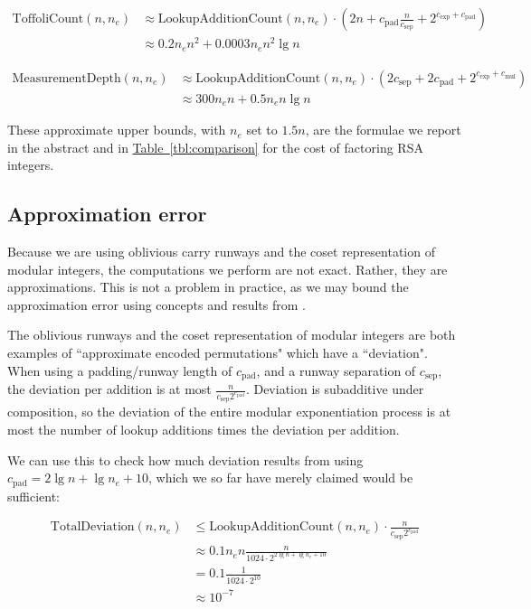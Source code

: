 \documentclass[superscriptaddress,notitlepage,longbibliography]{revtex4-1}
\theoremstyle{definition}
\theoremstyle{definition}
\newcommand{\tbl}[1]{\hyperref[tbl:#1]{Table~\ref*{tbl:#1}}}
\newcommand{\lenexp}{{n_e}}
\newcommand{\gexp}{{c_{\text{exp}}}}
\newcommand{\gmul}{{c_{\text{mul}}}}
\newcommand{\gsep}{{c_{\text{sep}}}}
\newcommand{\gpad}{{c_{\text{pad}}}}
\begin{document}
\begin{equation}
\begin{aligned}
    \text{ToffoliCount}(n, \lenexp)
    &\approx \text{LookupAdditionCount}(n, \lenexp) \cdot \left(2n + \gpad \frac{n}{\gsep} + 2^{\gexp + \gpad} \right)
    \\&\approx 0.2 \lenexp n^2 + 0.0003 \lenexp n^2 \lg n
\end{aligned}
\end{equation}

\begin{equation}
\begin{aligned}
    \text{MeasurementDepth}(n, \lenexp)
    &\approx \text{LookupAdditionCount}(n, \lenexp) \cdot \left(2 \gsep + 2\gpad + 2^{\gexp + \gmul} \right)
    \\&\approx 300 \lenexp n + 0.5 \lenexp n \lg n
\end{aligned}
\end{equation}

These approximate upper bounds, with $\lenexp$ set to $1.5n$, are the formulae we report in the abstract and in \tbl{comparison} for the cost of factoring RSA integers.


\subsection{Approximation error}

Because we are using oblivious carry runways and the coset representation of modular integers, the computations we perform are not exact.
Rather, they are approximations.
This is not a problem in practice, as we may bound the approximation error using concepts and results from \cite{gidney2019approximatepermutation}.

The oblivious runways and the coset representation of modular integers are both examples of ``approximate encoded permutations" which have a ``deviation".
When using a padding/runway length of $\gpad$, and a runway separation of $\gsep$, the deviation per addition is at most $\frac{n}{\gsep 2^{\gpad}}$.
Deviation is subadditive under composition, so the deviation of the entire modular exponentiation process is at most the number of lookup additions times the deviation per addition.

We can use this to check how much deviation results from using $\gpad = 2 \lg n + \lg \lenexp + 10$, which we so far have merely claimed would be sufficient:

\begin{equation}
\begin{aligned}
    \text{TotalDeviation}(n, \lenexp)
    &\leq \text{LookupAdditionCount}(n, \lenexp) \cdot \frac{n}{\gsep 2^{\gpad}}
    \\&\approx 0.1 \lenexp n \frac{n}{1024 \cdot 2^{2 \lg n + \lg \lenexp + 10}}
    \\&= 0.1 \frac{1}{1024 \cdot 2^{10}}
    \\&\approx 10^{-7}
\end{aligned}
\end{equation}
\end{document}
